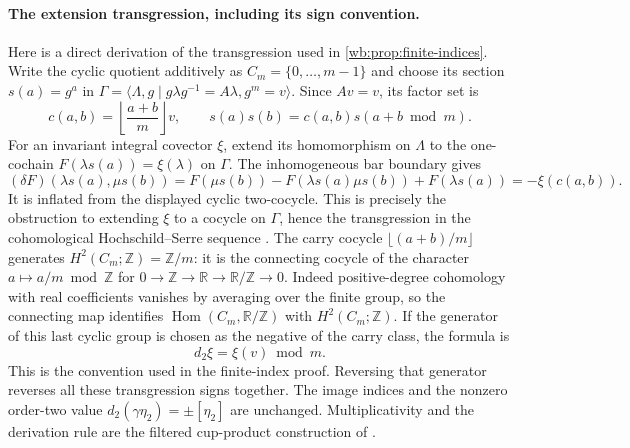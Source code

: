 \paragraph{The extension transgression, including its sign convention.}
Here is a direct derivation of the transgression used in
\cref{wb:prop:finite-indices}. Write the cyclic quotient additively as
$C_m=\{0,\ldots,m-1\}$ and choose its section $s(a)=g^a$ in
$\Gamma=\langle\Lambda,g\mid g\lambda g^{-1}=A\lambda,
g^m=v\rangle$. Since $Av=v$, its factor set is
\[
 c(a,b)=\left\lfloor\frac{a+b}{m}\right\rfloor v,
 \qquad s(a)s(b)=c(a,b)s(a+b\bmod m).
\]
For an invariant integral covector $\xi$, extend its homomorphism on
$\Lambda$ to the one-cochain $F(\lambda s(a))=\xi(\lambda)$ on
$\Gamma$. The inhomogeneous bar boundary
\cite[Chapter~I, \S5, equation~(5.2)]{Brown1982} gives
\[
 (\delta F)(\lambda s(a),\mu s(b))
 =F(\mu s(b))-F(\lambda s(a)\mu s(b))+F(\lambda s(a))
 =-\xi(c(a,b)).
\]
It is inflated from the displayed cyclic two-cocycle. This is precisely
the obstruction to extending $\xi$ to a cocycle on $\Gamma$, hence the
transgression in the cohomological Hochschild--Serre sequence
\cite[Chapter~VII, \S\S5--6, Theorem~6.3]{Brown1982}.
The carry cocycle $\lfloor(a+b)/m\rfloor$ generates
$H^2(C_m;\mathbb Z)=\mathbb Z/m$: it is the connecting cocycle of
the character $a\mapsto a/m\bmod\mathbb Z$ for
$0\to\mathbb Z\to\mathbb R\to\mathbb R/\mathbb Z\to0$.
Indeed positive-degree cohomology with real coefficients vanishes by
averaging over the finite group, so the connecting map identifies
$\operatorname{Hom}(C_m,\mathbb R/\mathbb Z)$ with
$H^2(C_m;\mathbb Z)$.
If the generator of this last cyclic group is chosen as the negative
of the carry class, the formula is
\[
                 d_2\xi=\xi(v)\bmod m.
\]
This is the convention used in the finite-index proof. Reversing that
generator reverses all these transgression signs together. The image
indices and the nonzero order-two value
$d_2(\gamma\eta_2)=\pm[\eta_2]$ are unchanged. Multiplicativity and
the derivation rule are the filtered cup-product construction of
\cite[Chapter~VII, \S5, pp.~170--171]{Brown1982}.
